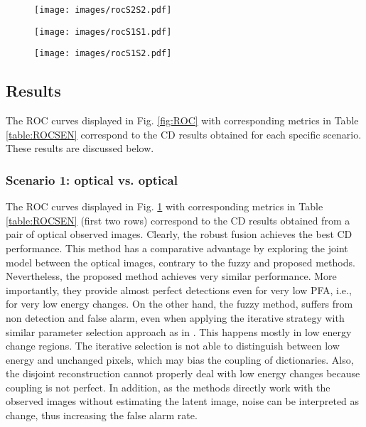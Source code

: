 \documentclass[review]{elsarticle}
\begin{document}
\newcommand{\subfigwidthROC}{0.65\columnwidth}
\newcommand{\figwidthROC}{1\textwidth}
	\begin{figure*}
    	\centering
        	\begin{subfigure}{\subfigwidthROC}
					\centering
					\texttt{[image: images/rocS2S2.pdf]}
					\caption{}
					\label{fig:rocS2S2}
			\end{subfigure}
			\begin{subfigure}{\subfigwidthROC}
					\centering
				  	\texttt{[image: images/rocS1S1.pdf]}
					\caption{}
					\label{fig:rocS1S1}
			\end{subfigure}
			\begin{subfigure}{\subfigwidthROC}
					\centering
					\texttt{[image: images/rocS1S2.pdf]}
					\caption{}
					\label{fig:rocS1S2}
			\end{subfigure}
			\caption{ROC curves on simulated data for different scenarios:  \protect{} Scenario 1,  \protect{} Scenario 2, \protect{} Scenario 3.}%
            \label{fig:ROC}%
	\end{figure*}


\subsection{Results}

The ROC curves displayed in Fig. \ref{fig:ROC} with corresponding metrics in Table \ref{table:ROCSEN} correspond to the CD results obtained for each specific scenario. These results are discussed below.

\subsubsection{Scenario 1: optical vs. optical}
The ROC curves displayed in Fig. \ref{fig:rocS2S2} with corresponding metrics in Table \ref{table:ROCSEN} (first two rows) correspond to the CD results obtained from a pair of optical observed images. Clearly, the robust fusion achieves the best CD performance. This method has a comparative advantage by exploring the joint model between the optical images, contrary to the fuzzy and proposed methods. Nevertheless, the proposed method achieves very similar performance. More importantly, they provide almost perfect detections even for very low PFA, i.e., for very low energy changes. On the other hand, the fuzzy method, suffers from non detection and false alarm, even when applying the iterative strategy with similar parameter selection approach as in \citet{gong_coupled_2016}. This happens mostly in low energy change regions. The iterative selection is not able to distinguish between low energy and unchanged pixels, which may bias the coupling of dictionaries. Also, the disjoint reconstruction cannot properly deal with low energy changes because coupling is not perfect. In addition, as the methods directly work with the observed images without estimating the latent image, noise can be interpreted as change, thus increasing the false alarm rate.
\end{document}
